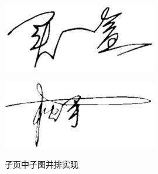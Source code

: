 \documentclass[AutoFakeBold]{ZafuThesis}
\begin{document}
\begin{figure}[htbp]
  \centering
  \begin{minipage}[b]{0.45\columnwidth}
    \centering
    \subfloat
    {\includegraphics[width=0.6\textwidth]{figures/MaiYihe}}
  \end{minipage}
  \begin{minipage}[b]{0.45\columnwidth}
    \centering
    \subfloat
    {\includegraphics[width=0.6\textwidth]{figures/SongShou}}      
  \end{minipage}
  \caption{子页中子图并排实现}
  \label{figure_子页中子图并排实现}
\end{figure}
\end{document}
